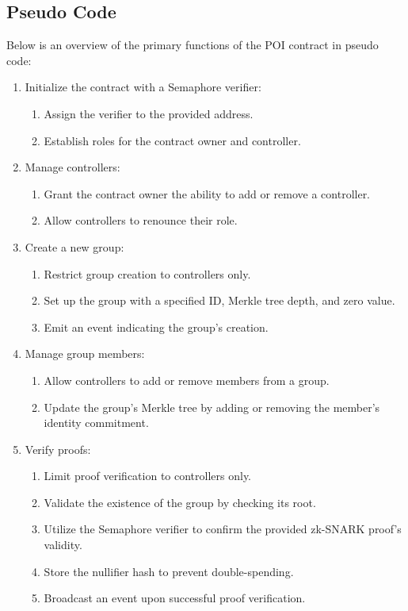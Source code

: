 \subsection{Pseudo Code}

Below is an overview of the primary functions of the POI contract in pseudo code:

\begin{enumerate}
\item Initialize the contract with a Semaphore verifier:
\begin{enumerate}
\item Assign the verifier to the provided address.
\item Establish roles for the contract owner and controller.
\end{enumerate}

\item Manage controllers:
\begin{enumerate}
\item Grant the contract owner the ability to add or remove a controller.
\item Allow controllers to renounce their role.
\end{enumerate}

\item Create a new group:
\begin{enumerate}
\item Restrict group creation to controllers only.
\item Set up the group with a specified ID, Merkle tree depth, and zero value.
\item Emit an event indicating the group's creation.
\end{enumerate}

\item Manage group members:
\begin{enumerate}
\item Allow controllers to add or remove members from a group.
\item Update the group's Merkle tree by adding or removing the member's identity commitment.
\end{enumerate}

\item Verify proofs:
\begin{enumerate}
\item Limit proof verification to controllers only.
\item Validate the existence of the group by checking its root.
\item Utilize the Semaphore verifier to confirm the provided zk-SNARK proof's validity.
\item Store the nullifier hash to prevent double-spending.
\item Broadcast an event upon successful proof verification.
\end{enumerate}
\end{enumerate}

